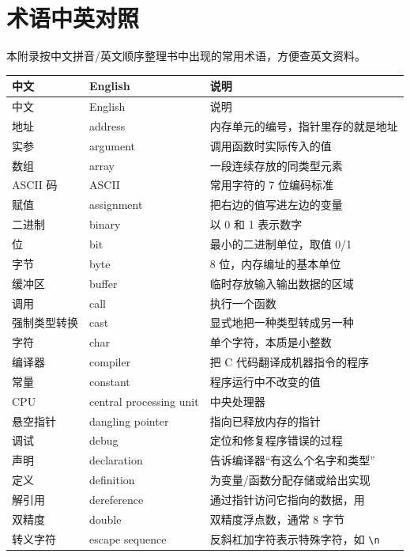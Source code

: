 \chapter{术语中英对照}
\label{app:glossary}

本附录按中文拼音/英文顺序整理书中出现的常用术语，方便查英文资料。

\begin{longtable}{@{}p{}p{}p{}@{}}
\toprule
中文 & English & 说明 \\
\midrule
\endfirsthead
\toprule
中文 & English & 说明 \\
\midrule
\endhead
\bottomrule
\endfoot
地址 & address & 内存单元的编号，指针里存的就是地址 \\
实参 & argument & 调用函数时实际传入的值 \\
数组 & array & 一段连续存放的同类型元素 \\
ASCII 码 & ASCII & 常用字符的 7 位编码标准 \\
赋值 & assignment & 把右边的值写进左边的变量 \\
二进制 & binary & 以 0 和 1 表示数字 \\
位 & bit & 最小的二进制单位，取值 0/1 \\
字节 & byte & 8 位，内存编址的基本单位 \\
缓冲区 & buffer & 临时存放输入输出数据的区域 \\
调用 & call & 执行一个函数 \\
强制类型转换 & cast & 显式地把一种类型转成另一种 \\
字符 & char & 单个字符，本质是小整数 \\
编译器 & compiler & 把 C 代码翻译成机器指令的程序 \\
常量 & constant & 程序运行中不改变的值 \\
CPU & central processing unit & 中央处理器 \\
悬空指针 & dangling pointer & 指向已释放内存的指针 \\
调试 & debug & 定位和修复程序错误的过程 \\
声明 & declaration & 告诉编译器“有这么个名字和类型” \\
定义 & definition & 为变量/函数分配存储或给出实现 \\
解引用 & dereference & 通过指针访问它指向的数据，用 \code{*} \\
双精度 & double & 双精度浮点数，通常 8 字节 \\
转义字符 & escape sequence & 反斜杠加字符表示特殊字符，如 \texttt{\textbackslash n} \\

\end{longtable}
